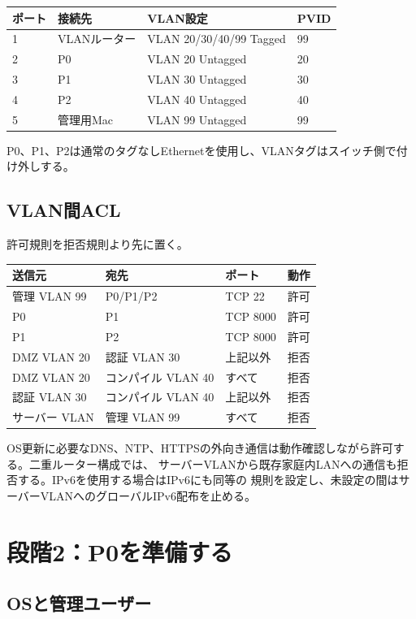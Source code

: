 \documentclass[uplatex,a4paper,11pt]{jsarticle}
\begin{document}
\begin{longtable}{@{}p{18mm}p{38mm}p{58mm}p{20mm}@{}}
\toprule
ポート & 接続先 & VLAN設定 & PVID\\
\midrule
1 & VLANルーター & VLAN 20/30/40/99 Tagged & 99\\
2 & P0 & VLAN 20 Untagged & 20\\
3 & P1 & VLAN 30 Untagged & 30\\
4 & P2 & VLAN 40 Untagged & 40\\
5 & 管理用Mac & VLAN 99 Untagged & 99\\
\bottomrule
\end{longtable}

P0、P1、P2は通常のタグなしEthernetを使用し、VLANタグはスイッチ側で付け外しする。

\subsection{VLAN間ACL}

許可規則を拒否規則より先に置く。

\begin{longtable}{@{}p{34mm}p{38mm}p{31mm}p{39mm}@{}}
\toprule
送信元 & 宛先 & ポート & 動作\\
\midrule
管理 VLAN 99 & P0/P1/P2 & TCP 22 & 許可\\
P0 & P1 & TCP 8000 & 許可\\
P1 & P2 & TCP 8000 & 許可\\
DMZ VLAN 20 & 認証 VLAN 30 & 上記以外 & 拒否\\
DMZ VLAN 20 & コンパイル VLAN 40 & すべて & 拒否\\
認証 VLAN 30 & コンパイル VLAN 40 & 上記以外 & 拒否\\
サーバー VLAN & 管理 VLAN 99 & すべて & 拒否\\
\bottomrule
\end{longtable}

OS更新に必要なDNS、NTP、HTTPSの外向き通信は動作確認しながら許可する。二重ルーター構成では、
サーバーVLANから既存家庭内LANへの通信も拒否する。IPv6を使用する場合はIPv6にも同等の
規則を設定し、未設定の間はサーバーVLANへのグローバルIPv6配布を止める。

\section{段階2：P0を準備する}

\subsection{OSと管理ユーザー}
\end{document}

